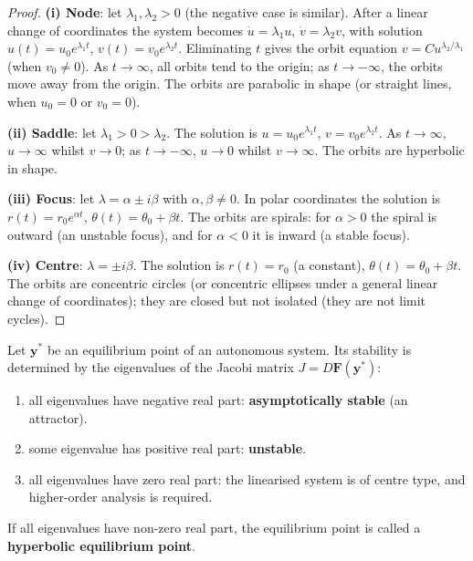 \begin{proof}
\textbf{(i) Node}: let $\lambda_1, \lambda_2 > 0$ (the negative case is similar). After a linear change of coordinates the system becomes $\dot{u} = \lambda_1 u$, $\dot{v} = \lambda_2 v$, with solution $u(t) = u_0 e^{\lambda_1 t}$, $v(t) = v_0 e^{\lambda_2 t}$. Eliminating $t$ gives the orbit equation $v = C u^{\lambda_2/\lambda_1}$ (when $v_0 \neq 0$). As $t \to \infty$, all orbits tend to the origin; as $t \to -\infty$, the orbits move away from the origin. The orbits are parabolic in shape (or straight lines, when $u_0 = 0$ or $v_0 = 0$).

\textbf{(ii) Saddle}: let $\lambda_1 > 0 > \lambda_2$. The solution is $u = u_0 e^{\lambda_1 t}$, $v = v_0 e^{\lambda_2 t}$. As $t \to \infty$, $u \to \infty$ whilst $v \to 0$; as $t \to -\infty$, $u \to 0$ whilst $v \to \infty$. The orbits are hyperbolic in shape.

\textbf{(iii) Focus}: let $\lambda = \alpha \pm i\beta$ with $\alpha, \beta \neq 0$. In polar coordinates the solution is $r(t) = r_0 e^{\alpha t}$, $\theta(t) = \theta_0 + \beta t$. The orbits are spirals: for $\alpha > 0$ the spiral is outward (an unstable focus), and for $\alpha < 0$ it is inward (a stable focus).

\textbf{(iv) Centre}: $\lambda = \pm i\beta$. The solution is $r(t) = r_0$ (a constant), $\theta(t) = \theta_0 + \beta t$. The orbits are concentric circles (or concentric ellipses under a general linear change of coordinates); they are closed but not isolated (they are not limit cycles).
\end{proof}

\begin{definition}\label{def:equilibrium_stability}
Let $\mathbf{y}^*$ be an equilibrium point of an autonomous system. Its stability is determined by the eigenvalues of the Jacobi matrix $J = D\mathbf{F}(\mathbf{y}^*)$:
\begin{enumerate}[label=(\roman*)]
    \item all eigenvalues have negative real part: \textbf{asymptotically stable} (an attractor).
    \item some eigenvalue has positive real part: \textbf{unstable}.
    \item all eigenvalues have zero real part: the linearised system is of centre type, and higher-order analysis is required.
\end{enumerate}
If all eigenvalues have non-zero real part, the equilibrium point is called a \textbf{hyperbolic equilibrium point}.
\end{definition}

